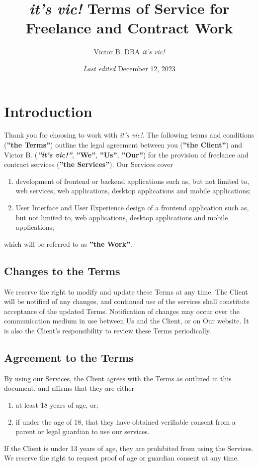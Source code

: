 \documentclass{article}
\title{\textit{it's vic!} Terms of Service for Freelance and Contract Work}
\author{Victor B. DBA \textit{it's vic!}}
\date{\textit{Last edited} December 12, 2023}
\begin{document}
\maketitle
\tableofcontents

\renewcommand{\labelenumi}{\alph{enumi})}

\section{Introduction}
Thank you for choosing to work with \textit{it's vic!}. The following terms and conditions (\textbf{''the Terms''}) outline the legal agreement between you (\textbf{''the Client''}) and Victor B. (\textbf{\textit{''it's vic!''}}, \textbf{''We''}, \textbf{''Us''}, \textbf{''Our''}) for the provision of freelance and contract services (\textbf{''the Services''}). Our Services cover 
\begin{enumerate}
    \item development of frontend or backend applications such as, but not limited to, web services, web applications, desktop applications and mobile applications;
    \item User Interface and User Experience design of a frontend application such as, but not limited to, web applications, desktop applications and mobile applications;
\end{enumerate}
which will be referred to as \textbf{''the Work''}.

\subsection{Changes to the Terms}
We reserve the right to modify and update these Terms at any time. The Client will be notified of any changes, and continued use of the services shall constitute acceptance of the updated Terms. Notification of changes may occur over the communication medium in use between Us and the Client, or on Our website. It is also the Client's responsibility to review these Terms periodically.

\subsection{Agreement to the Terms}
By using our Services, the Client agrees with the Terms as outlined in this document, and affirms that they are either
\begin{enumerate}
    \item at least 18 years of age, or;
    \item if under the age of 18, that they have obtained verifiable consent from a parent or legal guardian to use our services.
\end{enumerate}
If the Client is under 13 years of age, they are prohibited from using the Services. We reserve the right to request proof of age or guardian consent at any time.
\end{document}
